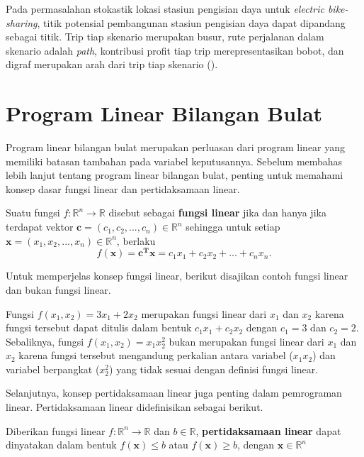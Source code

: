 Pada permasalahan stokastik lokasi stasiun pengisian daya untuk \textit{electric bike-sharing}, titik potensial pembangunan stasiun pengisian daya dapat dipandang sebagai titik. Trip tiap skenario merupakan busur, rute perjalanan dalam skenario adalah \textit{path}, kontribusi profit tiap trip merepresentasikan bobot, dan digraf merupakan arah dari trip tiap skenario ().
    
\section{Program Linear Bilangan Bulat}

Program linear bilangan bulat merupakan perluasan dari program linear yang memiliki batasan tambahan pada variabel keputusannya. Sebelum membahas lebih lanjut tentang program linear bilangan bulat, penting untuk memahami konsep dasar fungsi linear dan pertidaksamaan linear.

\begin{definisi}
    Suatu fungsi $f: \mathbb{R}^n \rightarrow \mathbb{R}$ disebut sebagai \textbf{fungsi linear} jika dan hanya jika terdapat vektor $\boldsymbol{c} = (c_1, c_2, ..., c_n) \in \mathbb{R}^n$ sehingga untuk setiap $\boldsymbol{x} = (x_1, x_2, ..., x_n) \in \mathbb{R}^n$, berlaku
    $$f(\boldsymbol{x}) = \boldsymbol{c^T x} = {c_1x_1 + c_2x_2 + ... + c_nx_n}.$$
\end{definisi}
Untuk memperjelas konsep fungsi linear, berikut disajikan contoh fungsi linear dan bukan fungsi linear.
\begin{contoh}
    Fungsi $f(x_1,x_2)=3x_1+2x_2$ merupakan fungsi linear dari $x_1$ dan $x_2$ karena fungsi tersebut dapat ditulis dalam bentuk $c_1x_1 + c_2x_2$ dengan $c_1 = 3$ dan $c_2 = 2$.
    Sebaliknya, fungsi $f(x_1,x_2)=x_1x_2^2$ bukan merupakan fungsi linear dari $x_1$ dan $x_2$ karena fungsi tersebut mengandung perkalian antara variabel ($x_1x_2$) dan variabel berpangkat ($x_2^2$) yang tidak sesuai dengan definisi fungsi linear.
\end{contoh}

Selanjutnya, konsep pertidaksamaan linear juga penting dalam pemrograman linear. Pertidaksamaan linear didefinisikan sebagai berikut.

\begin{definisi}
    Diberikan fungsi linear $f: \mathbb{R}^n \rightarrow \mathbb{R}$ dan $b \in \mathbb{R}$, \textbf{pertidaksamaan linear} dapat dinyatakan dalam bentuk $f(\textbf{x}) \leq b$ atau $f(\textbf{x}) \geq b$, dengan $\textbf{x} \in \mathbb{R}^n$
\end{definisi}

